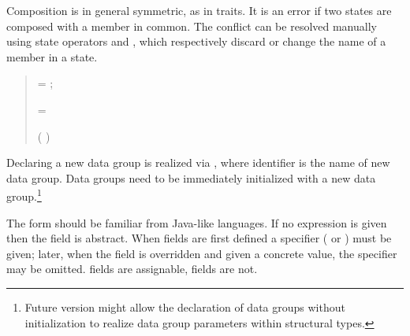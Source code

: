 Composition is in general symmetric, as in traits.  It is an error if two states are composed with a member in common. 
The conflict can be resolved manually using state operators  and , which
respectively discard or change the name of a member in a state. 

\begin{quote}




 {}  =   ;


 {}

 {}


 {}   = 


 {}  

 {}  


 {}  


 {} 


 {}    (  )

\end{quote}

Declaring a new data group is realized via , where identifier is the name of new 
data group. Data groups need to be immediately initialized with a new data group.$\!$\footnote{Future 
version might allow the declaration of data groups without initialization to realize data group 
parameters within structural types.} 

The  form should be familiar from Java-like
languages.  If no expression is given then the field is abstract.  
When fields are first defined a specifier ( or )
must be given; later, when the field is overridden and given a concrete
value, the specifier may be omitted.
 fields are assignable,  fields
are not.

